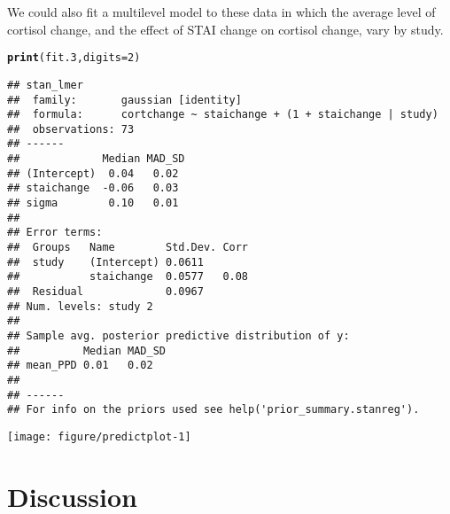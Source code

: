 \documentclass[review]{elsarticle}\usepackage[]{graphicx}\usepackage[]{color}
\makeatletter
\def\maxwidth{ %
  \ifdim\Gin@nat@width>\linewidth
    \linewidth
  \else
    \Gin@nat@width
  \fi
}
\newcommand{\hlnum}[1]{\textcolor[rgb]{0.686,0.059,0.569}{#1}}%
\newcommand{\hlstd}[1]{\textcolor[rgb]{0.345,0.345,0.345}{#1}}%
\newcommand{\hlkwc}[1]{\textcolor[rgb]{0.333,0.667,0.333}{#1}}%
\newcommand{\hlkwd}[1]{\textcolor[rgb]{0.737,0.353,0.396}{\textbf{#1}}}%
\newenvironment{kframe}{%
 \def\at@end@of@kframe{}%
 \ifinner\ifhmode%
  \def\at@end@of@kframe{\end{minipage}}%
  \begin{minipage}{\columnwidth}%
 \fi\fi%
 \def\FrameCommand##1{\hskip\@totalleftmargin \hskip-\fboxsep
 \colorbox{shadecolor}{##1}\hskip-\fboxsep
     \hskip-\linewidth \hskip-\@totalleftmargin \hskip\columnwidth}%
 \MakeFramed {\advance\hsize-\width
   \@totalleftmargin\z@ \linewidth\hsize
   \@setminipage}}%
 {\par\unskip\endMakeFramed%
 \at@end@of@kframe}
\newenvironment{knitrout}{}{} %
\makeatother
\begin{document}

We could also fit a multilevel model to these data in which the average level of cortisol change, and the effect of STAI change on cortisol change, vary by study.



\begin{knitrout}
\color{fgcolor}\begin{kframe}
\begin{alltt}
\hlkwd{print}\hlstd{(fit.3,} \hlkwc{digits} \hlstd{=} \hlnum{2}\hlstd{)}
\end{alltt}
\begin{verbatim}
## stan_lmer
##  family:       gaussian [identity]
##  formula:      cortchange ~ staichange + (1 + staichange | study)
##  observations: 73
## ------
##             Median MAD_SD
## (Intercept)  0.04   0.02 
## staichange  -0.06   0.03 
## sigma        0.10   0.01 
## 
## Error terms:
##  Groups   Name        Std.Dev. Corr
##  study    (Intercept) 0.0611       
##           staichange  0.0577   0.08
##  Residual             0.0967       
## Num. levels: study 2 
## 
## Sample avg. posterior predictive distribution of y:
##          Median MAD_SD
## mean_PPD 0.01   0.02  
## 
## ------
## For info on the priors used see help('prior_summary.stanreg').
\end{verbatim}
\end{kframe}
\end{knitrout}

\begin{knitrout}
\color{fgcolor}
\texttt{[image: figure/predictplot-1]} 

\end{knitrout}


\section*{Discussion} %
\label{sec:discussion2}
\end{document}
